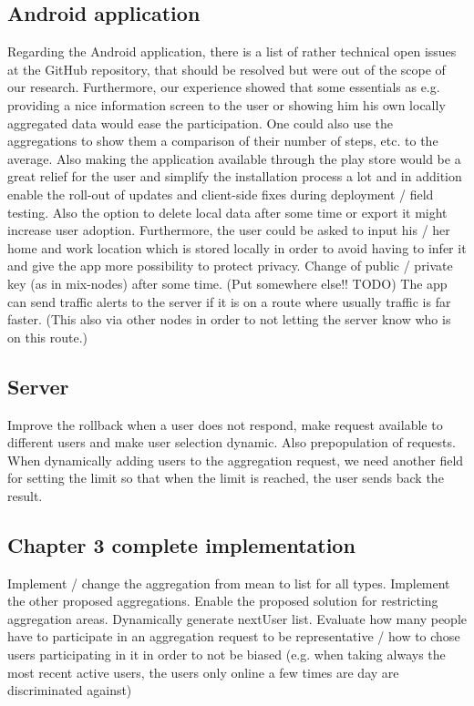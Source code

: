 \subsection{Android application}
Regarding the Android application, there is a list of rather technical open issues at the GitHub repository, that should be resolved but were out of the scope of our research. Furthermore, our experience showed that some essentials as e.g. providing a nice information screen to the user or showing him his own locally aggregated data would ease the participation. One could also use the aggregations to show them a comparison of their number of steps, etc. to the average. Also making the application available through the play store would be a great relief for the user and simplify the installation process a lot and in addition enable the roll-out of updates and client-side fixes during deployment / field testing. Also the option to delete local data after some time or export it might increase user adoption. Furthermore, the user could be asked to input his / her home and work location which is stored locally in order to avoid having to infer it and give the app more possibility to protect privacy.
Change of public / private key (as in mix-nodes) after some time.
(Put somewhere else!! TODO) The app can send traffic alerts to the server if it is on a route where usually traffic is far faster. (This also via other nodes in order to not letting the server know who is on this route.)

\subsection{Server}
Improve the rollback when a user does not respond, make request available to different users and make user selection dynamic. Also prepopulation of requests. When dynamically adding users to the aggregation request, we need another field for setting the limit so that when the limit is reached, the user sends back the result.

\subsection{Chapter 3 complete implementation}
Implement / change the aggregation from mean to list for all types. Implement the other proposed aggregations. Enable the proposed solution for restricting aggregation areas. Dynamically generate nextUser list.
Evaluate how many people have to participate in an aggregation request to be representative / how to chose users participating in it in order to not be biased (e.g. when taking always the most recent active users, the users only online a few times are day are discriminated against)

